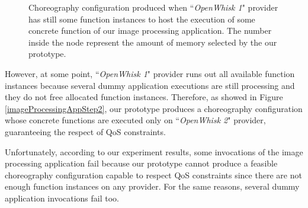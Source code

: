 \documentclass[12pt,a4paper]{report}
\newcommand{\ItalicQuotMark}[1]{``\textit{#1}"}
\begin{document}
\begin{figure}[!ht]
	\caption{Choreography configuration produced when \ItalicQuotMark{OpenWhisk 1} provider has still some function instances to host the execution of some concrete function of our image processing application. The number inside the node represent the amount of memory selected by the our prototype.}
	\label{imageProcessingAppStep1}
\end{figure}

However, at some point, \ItalicQuotMark{OpenWhisk 1} provider runs out all available function instances because several dummy application executions are still processing and they do not free allocated function instances. Therefore, as showed in Figure \ref{imageProcessingAppStep2}, our prototype produces a choreography configuration whose concrete functions are executed only on \ItalicQuotMark{OpenWhisk 2} provider, guaranteeing the respect of QoS constraints.

Unfortunately, according to our experiment results, some invocations of the image processing application fail because our prototype cannot produce a feasible choreography configuration capable to respect QoS constraints since there are not enough function instances on any provider. For the same reasons, several dummy application invocations fail too.
\end{document}

